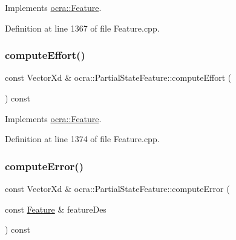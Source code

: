 Implements \hyperlink{classocra_1_1Feature_a19626a241666fdae253af1f7b6f2acd7}{ocra\+::\+Feature}.



Definition at line 1367 of file Feature.\+cpp.

\hypertarget{classocra_1_1PartialStateFeature_abc447a46a7bb1b4480af965119d23214}{}\label{classocra_1_1PartialStateFeature_abc447a46a7bb1b4480af965119d23214} 
\subsubsection{\texorpdfstring{compute\+Effort()}{computeEffort()}\hspace{0.1cm}{\footnotesize\ttfamily [2/2]}}
{\footnotesize\ttfamily const Vector\+Xd \& ocra\+::\+Partial\+State\+Feature\+::compute\+Effort (\begin{DoxyParamCaption}{ }\end{DoxyParamCaption}) const\hspace{0.3cm}{\ttfamily [virtual]}}



Implements \hyperlink{classocra_1_1Feature_ae43f2ffc54862d6ddc0b02fd39431eb6}{ocra\+::\+Feature}.



Definition at line 1374 of file Feature.\+cpp.

\hypertarget{classocra_1_1PartialStateFeature_af109d0d3c367db31f45f46fcc7c669c8}{}\label{classocra_1_1PartialStateFeature_af109d0d3c367db31f45f46fcc7c669c8} 
\subsubsection{\texorpdfstring{compute\+Error()}{computeError()}\hspace{0.1cm}{\footnotesize\ttfamily [1/2]}}
{\footnotesize\ttfamily const Vector\+Xd \& ocra\+::\+Partial\+State\+Feature\+::compute\+Error (\begin{DoxyParamCaption}\item[{const \hyperlink{classocra_1_1Feature}{Feature} \&}]{feature\+Des }\end{DoxyParamCaption}) const\hspace{0.3cm}{\ttfamily [virtual]}}



